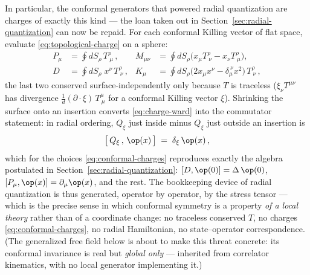 In particular, the conformal generators that powered radial quantization are
charges of exactly this kind --- the loan taken out in
Section~\ref{sec:radial-quantization} can now be repaid. For each conformal
Killing vector of flat space, evaluate \eqref{eq:topological-charge} on a
sphere:
\begin{equation}
\begin{aligned}
P_\mu &= \oint dS_\rho\, T^{\rho}_{\ \mu}\,, &
M_{\mu\nu} &= \oint dS_\rho \big(x_\mu T^{\rho}_{\ \nu} - x_\nu
T^{\rho}_{\ \mu}\big), \\
D &= \oint dS_\rho\; x^\nu\, T^{\rho}_{\ \nu}\,, &
K_\mu &= \oint dS_\rho \big(2 x_\mu x^\nu - \delta_\mu^{\ \nu}
x^2\big)\, T^{\rho}_{\ \nu}\,,
\end{aligned}
\label{eq:conformal-charges}
\end{equation}
the last two conserved surface-independently only because $T$ is traceless
($\xi_\nu T^{\mu\nu}$ has divergence $\tfrac1d (\partial\cdot\xi)\,
T^\mu_{\ \mu}$ for a conformal Killing vector $\xi$). Shrinking the surface
onto an insertion converts \eqref{eq:charge-ward} into the commutator
statement: in radial ordering, $Q_\xi$ just inside minus $Q_\xi$ just
outside an insertion is
\begin{equation}
\big[\, Q_\xi\,,\, \op(x)\,\big] \;=\; \delta_\xi\, \op(x)\,,
\label{eq:charge-commutator}
\end{equation}
which for the choices \eqref{eq:conformal-charges} reproduces exactly the
algebra postulated in Section~\ref{sec:radial-quantization}: $[D, \op(0)] =
\Delta\,\op(0)$, $[P_\mu, \op(x)] = \partial_\mu\op(x)$, and the rest. The
bookkeeping device of radial quantization is thus generated, operator by
operator, by the stress tensor --- which is the precise sense in which
conformal symmetry is a property \emph{of a local theory} rather than of a
coordinate change: no traceless conserved $T$, no charges
\eqref{eq:conformal-charges}, no radial Hamiltonian, no state--operator
correspondence. (The generalized free field below is about to make this
threat concrete: its conformal invariance is real but \emph{global only} ---
inherited from correlator kinematics, with no local generator implementing
it.)

